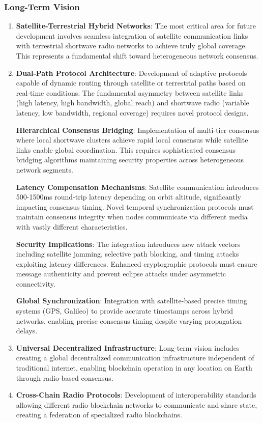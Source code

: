 \documentclass[11pt,a4paper]{article}
\begin{document}
\subsubsection{Long-Term Vision}

\begin{enumerate}
\item \textbf{Satellite-Terrestrial Hybrid Networks}: The most critical area for future development involves seamless integration of satellite communication links with terrestrial shortwave radio networks to achieve truly global coverage. This represents a fundamental shift toward heterogeneous network consensus.

\item \textbf{Dual-Path Protocol Architecture}: Development of adaptive protocols capable of dynamic routing through satellite or terrestrial paths based on real-time conditions. The fundamental asymmetry between satellite links (high latency, high bandwidth, global reach) and shortwave radio (variable latency, low bandwidth, regional coverage) requires novel protocol designs.

\textbf{Hierarchical Consensus Bridging}: Implementation of multi-tier consensus where local shortwave clusters achieve rapid local consensus while satellite links enable global coordination. This requires sophisticated consensus bridging algorithms maintaining security properties across heterogeneous network segments.

\textbf{Latency Compensation Mechanisms}: Satellite communication introduces 500-1500ms round-trip latency depending on orbit altitude, significantly impacting consensus timing. Novel temporal synchronization protocols must maintain consensus integrity when nodes communicate via different media with vastly different characteristics.

\textbf{Security Implications}: The integration introduces new attack vectors including satellite jamming, selective path blocking, and timing attacks exploiting latency differences. Enhanced cryptographic protocols must ensure message authenticity and prevent eclipse attacks under asymmetric connectivity.

\textbf{Global Synchronization}: Integration with satellite-based precise timing systems (GPS, Galileo) to provide accurate timestamps across hybrid networks, enabling precise consensus timing despite varying propagation delays.

\item \textbf{Universal Decentralized Infrastructure}: Long-term vision includes creating a global decentralized communication infrastructure independent of traditional internet, enabling blockchain operation in any location on Earth through radio-based consensus.

\item \textbf{Cross-Chain Radio Protocols}: Development of interoperability standards allowing different radio blockchain networks to communicate and share state, creating a federation of specialized radio blockchains.
\end{enumerate}
\end{document}

